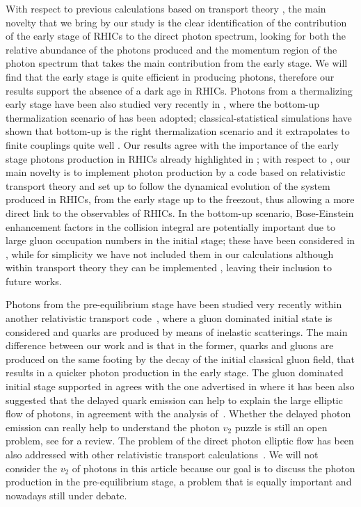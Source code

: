 \documentclass[aps,prc,a4paper,nofootinbib,
preprintnumbers,superscriptaddress,twocolumn,showpacs,showkeys]{revtex4}
\begin{document}
With respect to previous calculations based on transport theory
\cite{Linnyk:2015tha,Linnyk:2013wma,Linnyk:2015rco}, the main novelty that we bring by our study 
is the clear identification of the contribution of the early stage of RHICs to the direct photon spectrum,
looking for both the relative abundance of the photons produced and the momentum region of the photon 
spectrum that takes the main contribution from the early stage. We will find that the
early stage is quite efficient in producing photons, therefore our results support the absence 
of a dark age in RHICs.
Photons from a thermalizing early stage have been also studied very recently in
\cite{Berges:2017eom}, where the bottom-up thermalization scenario of \cite{Baier:2000sb}
has been adopted;  classical-statistical simulations have shown that 
bottom-up is the right thermalization scenario \cite{Berges:2013eia,Berges:2013fga}
and it extrapolates to finite couplings quite well \cite{Kurkela:2015qoa,Keegan:2016cpi}. 
Our results agree with the importance of 
the early stage photons production in RHICs already highlighted in \cite{Berges:2017eom};
with respect to \cite{Berges:2017eom}, our main novelty is to implement photon production
by a code based on relativistic transport theory and set up to follow 
the dynamical evolution of the system produced in RHICs, from the early stage
up to the freezout, 
thus allowing a more direct  link to the observables of RHICs. 
In the bottom-up scenario, Bose-Einstein enhancement factors
in the collision integral are potentially important due to large gluon occupation numbers in the initial stage;
these have been considered in \cite{Berges:2017eom}, while for simplicity
we have not included them in our calculations although within transport theory they can
be implemented \cite{Scardina:2014gxa}, leaving their inclusion to future works. 

Photons from the pre-equilibrium stage have been studied very recently  within
another relativistic transport code~\cite{Greif:2016jeb}, where a gluon dominated initial state is considered 
and quarks are produced by means of inelastic scatterings. The main difference between our work and \cite{Greif:2016jeb}
is that in the former, quarks and gluons are produced on the same footing by the decay of the initial classical
gluon field, that results in a quicker photon production in the early stage.
The gluon dominated initial stage supported in \cite{Greif:2016jeb} agrees with the one
advertised in \cite{Vovchenko:2016mtf,Liu:2012ax} where it has been also suggested that the delayed quark emission
can help to explain the large elliptic flow of photons, in agreement with
the analysis of~\cite{Liu:2014fya}. Whether the delayed photon emission can really help to understand
the photon $v_2$ puzzle is still an open problem, see \cite{Linnyk:2015rco} for a review. 
The problem of the direct photon elliptic flow has been also addressed with other relativistic transport calculations~\cite{Linnyk:2015tha}.
We will not consider %
the $v_2$ of photons in this article because our goal is to
discuss the photon production in the pre-equilibrium stage, a problem that is equally
important and nowadays still under debate.
\end{document}
